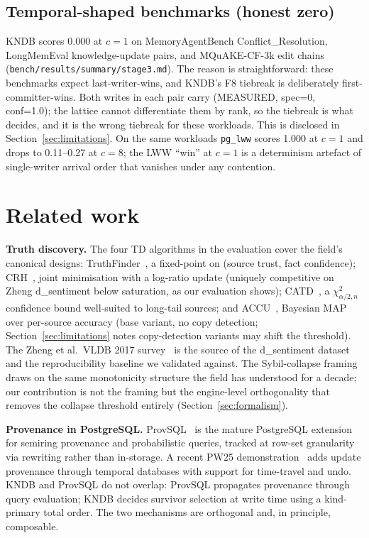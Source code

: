 \documentclass[sigconf, nonacm]{acmart}
\begin{document}
\subsection{Temporal-shaped benchmarks (honest zero)}
KNDB scores 0.000 at $c=1$ on MemoryAgentBench Conflict\_Resolution, LongMemEval knowledge-update pairs, and MQuAKE-CF-3k edit chains (\texttt{bench/results/summary/stage3.md}). The reason is straightforward: these benchmarks expect last-writer-wins, and KNDB's F8 tiebreak is deliberately first-committer-wins. Both writes in each pair carry (MEASURED, spec=0, conf=1.0); the lattice cannot differentiate them by rank, so the tiebreak is what decides, and it is the wrong tiebreak for these workloads. This is disclosed in Section~\ref{sec:limitations}. On the same workloads \texttt{pg\_lww} scores 1.000 at $c=1$ and drops to 0.11--0.27 at $c=8$; the LWW ``win'' at $c=1$ is a determinism artefact of single-writer arrival order that vanishes under any contention.

\section{Related work}
\label{sec:related}

\textbf{Truth discovery.} The four TD algorithms in the evaluation cover the field's canonical designs: TruthFinder~\cite{yin2007truthfinder}, a fixed-point on (source trust, fact confidence); CRH~\cite{li2014crh}, joint minimisation with a log-ratio update (uniquely competitive on Zheng d\_sentiment below saturation, as our evaluation shows); CATD~\cite{li2015catd}, a $\chi^{2}_{\alpha/2, n}$ confidence bound well-suited to long-tail sources; and ACCU~\cite{dong2009accu}, Bayesian MAP over per-source accuracy (base variant, no copy detection; Section~\ref{sec:limitations} notes copy-detection variants may shift the threshold). The Zheng et al.\ VLDB 2017 survey~\cite{zheng2017crowdsourcing} is the source of the d\_sentiment dataset and the reproducibility baseline we validated against. The Sybil-collapse framing draws on the same monotonicity structure the field has understood for a decade; our contribution is not the framing but the engine-level orthogonality that removes the collapse threshold entirely (Section~\ref{sec:formalism}).

\textbf{Provenance in PostgreSQL.} ProvSQL~\cite{senellart2018provsql} is the mature PostgreSQL extension for semiring provenance and probabilistic queries, tracked at row-set granularity via rewriting rather than in-storage. A recent PW25 demonstration~\cite{widiaatmaja2025provsql} adds update provenance through temporal databases with support for time-travel and undo. KNDB and ProvSQL do not overlap: ProvSQL propagates provenance through query evaluation; KNDB decides survivor selection at write time using a kind-primary total order. The two mechanisms are orthogonal and, in principle, composable.
\end{document}
